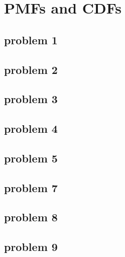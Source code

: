 \section{PMFs and CDFs}

\subsection{problem 1}


\subsection{problem 2}


\subsection{problem 3}


\subsection{problem 4}


\subsection{problem 5}


\subsection{problem 7}


\subsection{problem 8}


\subsection{problem 9}
